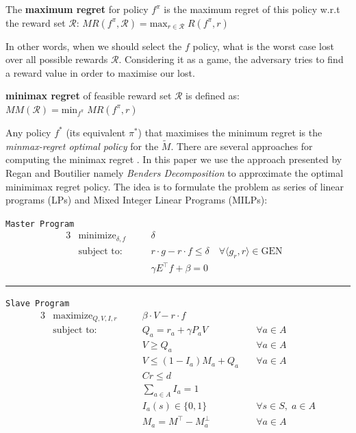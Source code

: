 \documentclass[runningheads,a4paper]{llncs}
\begin{document}
\begin{definition}
The \textbf{maximum regret} for policy $f^{\pi}$ is the maximum regret of this policy w.r.t the reward set $\mathcal{R}$: $MR(f^{\pi}, \mathcal{R}) = \text{max}_{r \in \mathcal{R}}\;R(f^{\pi},r)$ 
\end{definition}

In other words, when we should select the $f$ policy, what is the worst case lost over all possible rewards $\mathcal{R}$. Considering it as a game, the adversary tries to find a reward value in order to maximise our lost.  

\begin{definition}
\textbf{minimax regret} of feasible reward set $\mathcal{R}$ is defined as:\\ $MM(\mathcal{R}) = \text{min}_{f^{\pi}}\; MR(f^{\pi}, r)$
\end{definition}

Any policy $f^*$ (its equivalent $\pi^*$) that maximises the minimum regret is the \textit{minmax-regret optimal policy} for the $\tilde{M}$. There are several approaches for computing the minimax regret \cite{alizadeh2015,benavent2018,Regan2009,daSilva2011,Xu2009}. In this paper we use the approach presented by Regan and Boutilier \citep{Regan2009} namely \textit{Benders Decomposition} \cite{Benders1962} to approximate the optimal minimimax regret policy. The idea is to formulate the problem as series of linear programs (LPs) and Mixed Integer Linear Programs (MILPs):


\begin{center}\label{minimax}
\texttt{Master Program}
\begin{alignat}{3}
&\text{minimize}_{\delta, f} && \delta & \\
&\text{subject to:}&\quad& r\cdot g - r \cdot f \leq \delta \quad \forall \langle g_r, r \rangle \in \text{GEN}\label{delta_cut}\\
&& \quad& \gamma E^{\top} f + \beta = 0 
\end{alignat}
\begin{center}
\noindent\rule{8cm}{0.4pt}
\end{center} 
\texttt{Slave Program}
\begin{alignat}{3}
&\text{maximize}_{Q, V, I, r} && \beta \cdot V - r \cdot f \\
&\text{subject to:} &\quad& Q_a = r_a + \gamma P_aV &\quad \forall a \in A\\
&& \quad& V \geq Q_a  &\quad \forall a \in A\\
&& \quad& V \leq (1-I_a)M_a + Q_a  &\quad \forall a \in A\\
&& \quad& Cr \leq d \\
&& \quad& \sum_{a \in A} I_a = 1  \label{eq:sum_I}\\
&& \quad& I_a(s) \in \{0, 1 \} &\quad \forall s \in S, \; a \in A \label{eq:bin_I}\\
&& \quad& M_a = M^{\top} - M_a^{\perp} &\quad \forall a \in A
\end{alignat}
\end{center}
\end{document}
